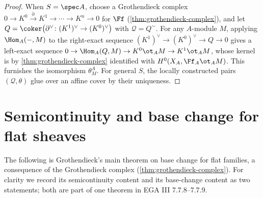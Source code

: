 \begin{proof}
  When $S=\spec A$, choose a Grothendieck complex
  $0\to K^0\xrightarrow{\partial}K^1\to\cdots\to K^n\to 0$ for $\Ff$
  (\cref{thm:grothendieck-complex}), and let $Q=\coker\bigl(\partial^\vee\colon
  (K^1)^\vee\to(K^0)^\vee\bigr)$ with $\mathcal{Q}=Q^\sim$. For any $A$-module
  $M$, applying $\Hom_A(-,M)$ to the right-exact sequence
  $(K^1)^\vee\to(K^0)^\vee\to Q\to 0$ gives a left-exact sequence
  $0\to\Hom_A(Q,M)\to K^0\ot_A M\to K^1\ot_A M$, whose kernel is by
  \cref{thm:grothendieck-complex} identified with $H^0(X_A,\Ff_A\ot_A M)$. This
  furnishes the isomorphism $\theta^A_M$. For general $S$, the locally
  constructed pairs $(\mathcal{Q},\theta)$ glue over an affine cover by their
  uniqueness.
\end{proof}

\section{Semicontinuity and base change for flat sheaves}

The following is Grothendieck's main theorem on base change for flat families,
a consequence of the Grothendieck complex (\cref{thm:grothendieck-complex}). For
clarity we record its semicontinuity content and its base-change content as two
statements; both are part of one theorem in EGA III 7.7.8--7.7.9.

